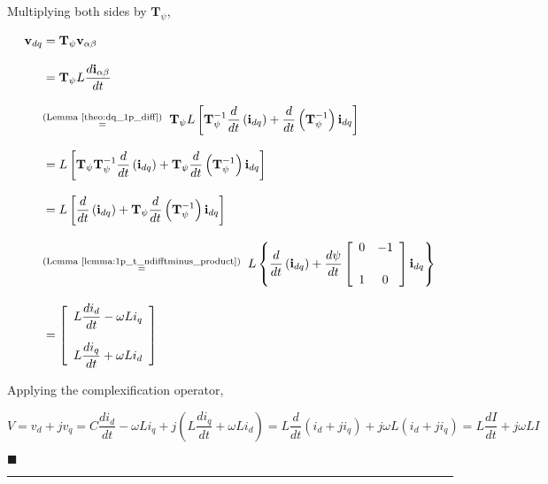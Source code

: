 	Multiplying both sides by $\mathbf{T}_{\psi}$,

\begin{align}
	\mathbf{v}_{dq} &= \mathbf{T}_\psi \mathbf{v}_{\alpha\beta} \nonumber\\[3mm]
	&= \mathbf{T}_\psi L\dfrac{d\mathbf{i}_{\alpha\beta}}{dt} \nonumber\\[3mm] 
	&\substack{\text{(Lemma \ref{theo:dq_1p_diff})} \\ =}\hspace{2mm} \mathbf{T}_\psi L\left[ \mathbf{T}^{-1}_\psi \dfrac{d}{dt}\left(\mathbf{i}_{dq}\right) + \dfrac{d}{dt}\left(\mathbf{T}^{-1}_\psi \right) \mathbf{i}_{dq} \right] \nonumber\\[3mm] 
	&= L\left[ \mathbf{T}_\psi \mathbf{T}^{-1}_\psi \dfrac{d}{dt}\left(\mathbf{i}_{dq}\right) + \mathbf{T}_\psi \dfrac{d}{dt}\left(\mathbf{T}^{-1}_\psi \right) \mathbf{i}_{dq} \right] \nonumber\\[3mm] 
	&= L\left[ \dfrac{d}{dt}\left(\mathbf{i}_{dq}\right) + \mathbf{T}_{\psi}\dfrac{d}{dt}\left(\mathbf{T}^{-1}_\psi \right) \mathbf{i}_{dq} \right] \nonumber\\[3mm]
	&\substack{\text{(Lemma \ref{lemma:1p_t_ndifftminus_product})} \\ =}\hspace{2mm} L\left\{ \dfrac{d}{dt}\left(\mathbf{i}_{dq}\right) + \dfrac{d\psi}{dt} \left[\begin{array}{cc}    0 & -1 \\[5mm] 1 & 0 \end{array}\right] \mathbf{i}_{dq} \right\} \nonumber\\[3mm]
%
%
&= \left[\begin{array}{l}
        L\dfrac{di_d}{dt} - \omega L i_q \\[5mm]
        L\dfrac{di_q}{dt} + \omega L i_d
\end{array}\right]
\end{align}

	Applying the complexification operator,

\begin{equation} V = v_d + jv_q = C\dfrac{di_d}{dt} - \omega L i_q + j\left(L\dfrac{di_q}{dt} + \omega L i_d\right) = L\dfrac{d}{dt}\left(i_d + ji_q\right) + j\omega L\left(i_d + ji_q\right) = L\dfrac{dI}{dt} + j\omega L I \end{equation}

\hfill$\blacksquare$

\vspace{5mm}
\hrule
\vspace{5mm}

